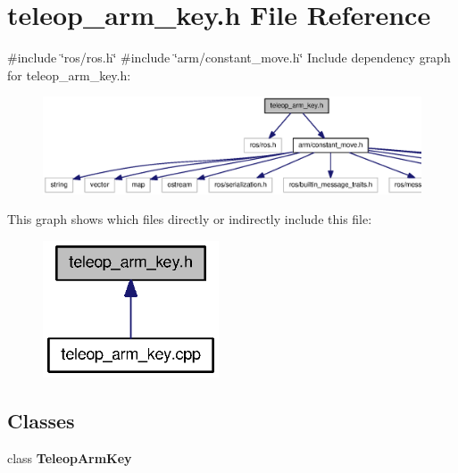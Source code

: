 \section{teleop\-\_\-arm\-\_\-key.\-h \-File \-Reference}
\label{teleop__arm__key_8h}
{\ttfamily \#include \char`\"{}ros/ros.\-h\char`\"{}}\*
{\ttfamily \#include \char`\"{}arm/constant\-\_\-move.\-h\char`\"{}}\*
\-Include dependency graph for teleop\-\_\-arm\-\_\-key.\-h\-:\nopagebreak
\begin{figure}[H]
\begin{center}
\leavevmode
\includegraphics[width=350pt]{teleop__arm__key_8h__incl}
\end{center}
\end{figure}
\-This graph shows which files directly or indirectly include this file\-:\nopagebreak
\begin{figure}[H]
\begin{center}
\leavevmode
\includegraphics[width=148pt]{teleop__arm__key_8h__dep__incl}
\end{center}
\end{figure}
\subsection*{\-Classes}
\begin{DoxyCompactItemize}
\item 
class {\bf \-Teleop\-Arm\-Key}
\end{DoxyCompactItemize}
